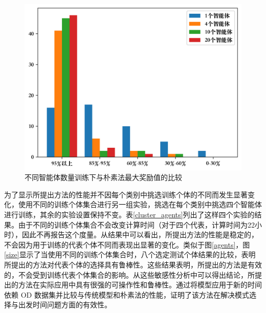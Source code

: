 \begin{figure}
  \centering
  \includegraphics[width=.75\linewidth]{figures/content/number.png}
  \caption{不同智能体数量训练下与朴素法最大奖励值的比较}
  \label{agent_map}
\end{figure}


为了显示所提出方法的性能并不因每个类别中挑选训练个体的不同而发生显著变化，使用不同的训练个体集合进行另一组实验，挑选在每个类别中挑选四个智能体进行训练，其余的实验设置保持不变。表\ref{cluster_agents}列出了这样四个实验的结果。由于不同的训练个体集合不会改变计算时间（对于四个代表，计算时间为22小时），因此不再报告这个度量。从结果中可以看出，所提出方法的性能是稳定的，不会因为用于训练的代表个体不同而表现出显著的变化。类似于图\ref{agents}，图\ref{size}显示了当使用不同的训练个体集合时，八个选定测试个体结果的比较，表明所提出的方法对代表个体的选择具有鲁棒性。这些结果表明，所提出的方法是有效的，不会受到训练代表个体集合的影响。从这些敏感性分析中可以得出结论，所提出的方法在实际应用中具有很强的可操作性和鲁棒性。通过将模型应用于新的时间依赖 OD 数据集并比较与传统模型和朴素法的性能，证明了该方法在解决模式选择与出发时间问题方面的有效性。

